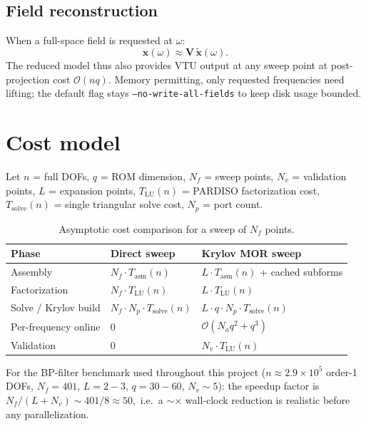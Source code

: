 \documentclass[11pt,a4paper]{article}
\begin{document}
\subsection{Field reconstruction}

When a full-space field is requested at $\omega$:
\begin{equation}
  \bm x(\omega) \approx \bm V\,\widetilde{\bm x}(\omega).
\end{equation}
The reduced model thus also provides VTU output at any sweep point at
post-projection cost $\mathcal{O}(nq)$. Memory permitting, only requested
frequencies need lifting; the default flag stays
\texttt{--no-write-all-fields} to keep disk usage bounded.

\section{Cost model}

Let $n$ = full DOFs, $q$ = ROM dimension, $N_f$ = sweep points,
$N_v$ = validation points, $L$ = expansion points,
$T_{\mathrm{LU}}(n)$ = PARDISO factorization cost,
$T_{\mathrm{solve}}(n)$ = single triangular solve cost, $N_p$ = port count.

\begin{table}[h]
\centering
\caption{Asymptotic cost comparison for a sweep of $N_f$ points.}
\begin{tabular}{lll}
\toprule
Phase & Direct sweep & Krylov MOR sweep \\
\midrule
Assembly & $N_f \cdot T_{\mathrm{asm}}(n)$ & $L \cdot T_{\mathrm{asm}}(n)$ + cached subforms\\
Factorization & $N_f \cdot T_{\mathrm{LU}}(n)$ & $L \cdot T_{\mathrm{LU}}(n)$\\
Solve / Krylov build & $N_f \cdot N_p \cdot T_{\mathrm{solve}}(n)$ & $L\cdot q \cdot N_p \cdot T_{\mathrm{solve}}(n)$\\
Per-frequency online & 0 & $\mathcal{O}(N_a q^2 + q^3)$\\
Validation & 0 & $N_v \cdot T_{\mathrm{LU}}(n)$\\
\bottomrule
\end{tabular}
\end{table}

For the BP-filter benchmark used throughout this project ($n\!\approx\!2.9\!\times\!10^5$
order-1 DOFs, $N_f=401$, $L=2{-}3$, $q=30{-}60$,
$N_v\!\sim\!5$): the speedup factor is
\(
  N_f / (L + N_v) \sim 401 / 8 \approx 50,
\)
i.e.\ a $\sim$$\times$ wall-clock reduction is realistic before any
parallelization.
\end{document}

